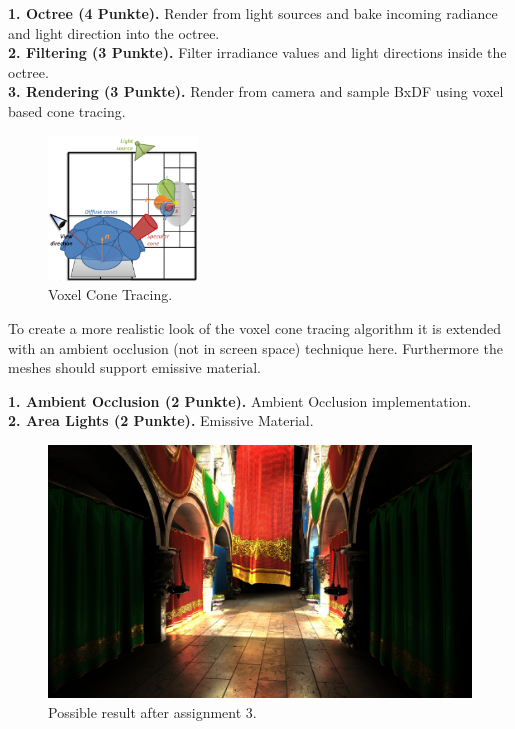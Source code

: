 \documentclass[A4paper]{gdv/gdv}
\newcommand{\teilaufgabe}[1]{\textbf{#1.}}
\begin{document}
\begin{gdvSheet}
\teilaufgabe{1. Octree (4 Punkte)} Render from light sources and bake incoming radiance and light direction into the octree. \\
\teilaufgabe{2. Filtering (3 Punkte)} Filter irradiance values and light directions inside the octree. \\
\teilaufgabe{3. Rendering (3 Punkte)} Render from camera and sample BxDF using voxel based cone tracing. \\

\begin{figure}[h]
\centering
\includegraphics[width=150px]{img/voxel.png}
\caption{Voxel Cone Tracing.}
\end{figure}
  
To create a more realistic look of the voxel cone tracing algorithm it is extended with an ambient occlusion (not in screen space) technique here. Furthermore the meshes should support emissive material.

\teilaufgabe{1. Ambient Occlusion (2 Punkte)} Ambient Occlusion implementation. \\
\teilaufgabe{2. Area Lights (2 Punkte)} Emissive Material. \\

\begin{figure}[h]
\centering
\includegraphics[width=450px]{img/sponza-voxelcone.jpg}
\caption{Possible result after assignment 3.}
\end{figure}


\end{gdvSheet}
\end{document}
